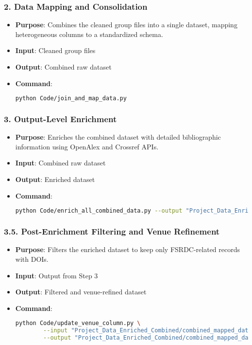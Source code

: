 \documentclass[12pt]{article}
\begin{document}
\subsubsection{2. Data Mapping and Consolidation}
\begin{itemize}
    \item \textbf{Purpose}: Combines the cleaned group files into a single dataset, mapping heterogeneous columns to a standardized schema.
    \item \textbf{Input}: Cleaned group files
    \item \textbf{Output}: Combined raw dataset
    \item \textbf{Command}:
    \begin{lstlisting}[language=bash]
    python Code/join_and_map_data.py
    \end{lstlisting}
\end{itemize}

\subsubsection{3. Output-Level Enrichment}
\begin{itemize}
    \item \textbf{Purpose}: Enriches the combined dataset with detailed bibliographic information using OpenAlex and Crossref APIs.
    \item \textbf{Input}: Combined raw dataset
    \item \textbf{Output}: Enriched dataset
    \item \textbf{Command}:
    \begin{lstlisting}[language=bash]
    python Code/enrich_all_combined_data.py --output "Project_Data_Enriched_Combined/combined_mapped_data_raw_enriched_final.csv"
    \end{lstlisting}
\end{itemize}

\subsubsection{3.5. Post-Enrichment Filtering and Venue Refinement}
\begin{itemize}
    \item \textbf{Purpose}: Filters the enriched dataset to keep only FSRDC-related records with DOIs.
    \item \textbf{Input}: Output from Step 3
    \item \textbf{Output}: Filtered and venue-refined dataset
    \item \textbf{Command}:
    \begin{lstlisting}[language=bash]
    python Code/update_venue_column.py \
        --input "Project_Data_Enriched_Combined/combined_mapped_data_raw_enriched_final.csv" \
        --output "Project_Data_Enriched_Combined/combined_mapped_data_raw_enriched_final_final.csv"
    \end{lstlisting}
\end{itemize}
\end{document}
